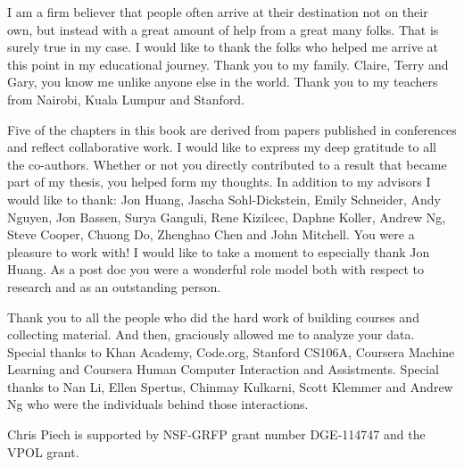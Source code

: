 
I am a firm believer that people often arrive at their destination not on their own, but instead with a great amount of help from a great many folks. That is surely true in my case. 
I would like to thank the folks who helped me arrive at this point in my educational journey. Thank you to my family. Claire, Terry and Gary, you know me unlike anyone else in the world. Thank you to my teachers from Nairobi, Kuala Lumpur and Stanford. 

Five of the chapters in this book are derived from papers published in conferences and reflect collaborative work. I would like to express my deep gratitude to all the co-authors. Whether or not you directly contributed to a result that became part of my thesis, you helped form my thoughts. In addition to my advisors I would like to thank: Jon Huang, Jascha Sohl-Dickstein, Emily Schneider, Andy Nguyen, Jon Bassen, Surya Ganguli, Rene Kizilcec, Daphne Koller, Andrew Ng, Steve Cooper, Chuong Do, Zhenghao Chen and John Mitchell. You were a pleasure to work with! I would like to take a moment to especially thank Jon Huang. As a post doc you were a wonderful role model both with respect to research and as an outstanding person.

Thank you to all the people who did the hard work of building courses and collecting material. And then, graciously allowed me to analyze your data. Special thanks to Khan Academy, Code.org, Stanford CS106A, Coursera Machine Learning and Coursera Human Computer Interaction and Assistments. Special thanks to Nan Li, Ellen Spertus, Chinmay Kulkarni, Scott Klemmer and Andrew Ng who were the individuals behind those interactions. 

Chris Piech is supported by NSF-GRFP grant number DGE-114747 and the VPOL grant. 
